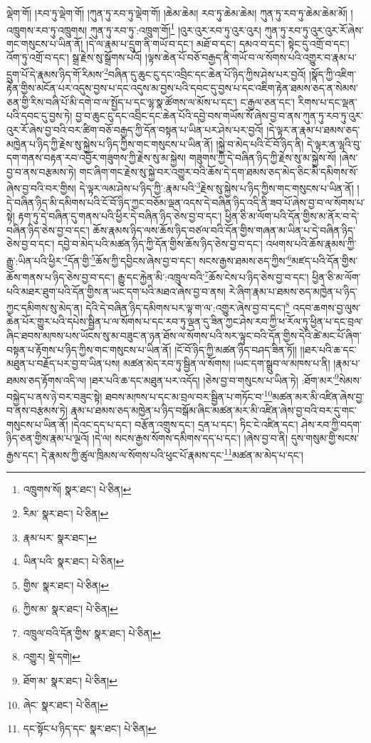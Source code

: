 ལྡེག་གོ། །རབ་ཏུ་ལྡེག་གོ། །ཀུན་ཏུ་རབ་ཏུ་ལྡེག་གོ། །ཆེམ་ཆེམ། རབ་ཏུ་ཆེམ་ཆེམ། ཀུན་ཏུ་རབ་ཏུ་ཆེམ་ཆེམ་མོ། །འཁྲུགས་རབ་ཏུ་འཁྲུགས། ཀུན་ཏུ་རབ་ཏུ་:འཁྲུག་གོ།\footnote{འཁྲུགས་སོ།  སྣར་ཐང་།  པེ་ཅིན། } །འུར་འུར་རབ་ཏུ་འུར་འུར། ཀུན་ཏུ་རབ་ཏུ་འུར་འུར་རོ་ཞེས་གང་གསུངས་པ་ཡིན་ནོ། །དེ་ལ་རྣམ་པ་དྲུག་ནི་གཡོ་བ་དང་། མཐོ་བ་དང་། དམའ་བ་དང་། སྟེང་དུ་འགྲོ་བ་དང་། འོག་ཏུ་འགྲོ་བ་དང་། སྒྲ་རྗེས་སུ་སྒྲོགས་པའོ། །ལྟས་ཆེན་པོ་བཅོ་བརྒྱད་ནི་གཡོ་བ་ལ་སོགས་པའི་འགྱུར་བ་རྣམ་པ་དྲུག་པོ་དེ་རྣམས་ཉིད་གོ་རིམས་\footnote{རིམ་  སྣར་ཐང་།  པེ་ཅིན། }བཞིན་དུ་ཆུང་ངུ་དང་འབྲིང་དང་ཆེན་པོ་ཉིད་ཀྱིས་ཤེས་པར་བྱའོ། །སྣོད་ཀྱི་འཇིག་རྟེན་གྱིས་མངོན་པར་འདུས་བྱས་པ་དང་འདུས་མ་བྱས་པའི་དབང་དུ་བྱས་པ་དང་འཇིག་རྟེན་ཐམས་ཅད་ན་སེམས་ཅན་གྱི་རིས་བཞི་པོ་མི་དགེ་བ་ལ་སྤྱོད་པ་དང་ལྷ་སྣ་ཚོགས་ལ་མོས་པ་དང་། ང་རྒྱལ་ཅན་དང་། རིགས་པ་དང་ལྡན་པའི་དབང་དུ་བྱས་ཏེ། བྱ་བ་ཆུང་ངུ་དང་འབྲིང་དང་ཆེན་པོའི་དབྱེ་བས་གཡོས་སོ་ཞེས་བྱ་བ་ནས་ཀུན་ཏུ་རབ་ཏུ་འུར་འུར་རོ་ཞེས་བྱ་བའི་བར་ཚིག་བཅོ་བརྒྱད་ཀྱི་དོན་བསྟན་པ་ཡིན་པར་ཤེས་པར་བྱའོ། །དེ་ལྟར་ན་རྣམ་པ་ཐམས་ཅད་མཁྱེན་པ་ཉིད་ཀྱི་རྗེས་སུ་སྐྱེས་པ་ཉིད་ཀྱིས་གང་གསུངས་པ་ཡིན་ནོ། །སྐྱེ་བ་མེད་པའི་ངོ་བོ་ཉིད་ནི། དེ་ལྟར་ན་ལྷའི་བུ་དག་གནས་བརྟན་རབ་འབྱོར་གཟུགས་ཀྱི་རྗེས་སུ་མ་སྐྱེས། གཟུགས་ཀྱི་དེ་བཞིན་ཉིད་ཀྱི་རྗེས་སུ་མ་སྐྱེས་སོ། །ཞེས་བྱ་བ་ནས་བརྩམས་ཏེ། གང་ཞིག་གང་རྗེས་སུ་སྐྱེ་བར་འགྱུར་བའི་ཆོས་དེ་དག་ཐམས་ཅད་མེད་ཅིང་མི་དམིགས་སོ་ཞེས་བྱ་བའི་བར་གྱིས། དེ་ལྟར་ལམ་ཤེས་པ་ཉིད་ཀྱི་:རྣམ་པའི་\footnote{རྣམ་པར་  སྣར་ཐང་། }རྗེས་སུ་སྐྱེས་པ་ཉིད་ཀྱིས་གང་གསུངས་པ་ཡིན་ནོ། །དེ་བཞིན་ཉིད་མི་དམིགས་པའི་ངོ་བོ་ཉིད་ཀྱང་བཅོམ་ལྡན་འདས་དེ་བཞིན་ཉིད་འདི་ནི་ཟབ་པོ་ཞེས་བྱ་བ་ལ་སོགས་པ་སྟེ། རྟག་ཏུ་དེ་བཞིན་དུ་གནས་པའི་ཕྱིར་དེ་བཞིན་ཉིད་ཅེས་བྱ་བ་དང་། ཕྱིན་ཅི་མ་ལོག་པའི་དོན་གྱིས་མ་ནོར་བ་དེ་བཞིན་ཉིད་ཅེས་བྱ་བ་དང་། ཆོས་རྣམས་ཉིད་ལས་ཆོས་ཉིད་བཙལ་བའི་དོན་གྱིས་གཞན་མ་ཡིན་པ་དེ་བཞིན་ཉིད་ཅེས་བྱ་བ་དང་། དབྱེ་བ་མེད་པའི་མཚན་ཉིད་ཀྱི་དོན་གྱིས་ཆོས་ཉིད་ཅེས་བྱ་བ་དང་། འཕགས་པའི་ཆོས་རྣམས་ཀྱི་རྒྱུ་:ཡིན་པའི་ཕྱིར་\footnote{ཡིན་པའི་  སྣར་ཐང་།  པེ་ཅིན། }དོན་གྱི་\footnote{གྱིས་  སྣར་ཐང་།  པེ་ཅིན། }ཆོས་ཀྱི་དབྱིངས་ཞེས་བྱ་བ་དང་། སངས་རྒྱས་ཐམས་ཅད་ཀྱིས་\footnote{ཀྱིས་མ་  སྣར་ཐང་།  པེ་ཅིན། }མཛད་པའི་དོན་གྱིས་ཆོས་གནས་པ་ཉིད་ཅེས་བྱ་བ་དང་། རྒྱུ་དང་རྐྱེན་མི་:འཁྲུལ་བའི་\footnote{འཁྲུལ་བའི་དོན་གྱིས་  སྣར་ཐང་།  པེ་ཅིན། }ཆོས་ངེས་པ་ཉིད་ཅེས་བྱ་བ་དང་། ཕྱིན་ཅི་མ་ལོག་པའི་མཐར་ཐུག་པའི་དོན་གྱིས་ན་ཡང་དག་པའི་མཐའ་ཞེས་བྱ་བ་ནས། རེ་ཞིག་རྣམ་པ་ཐམས་ཅད་མཁྱེན་པ་ཉིད་ཀྱང་དམིགས་སུ་མེད་ན། དེའི་དེ་བཞིན་ཉིད་དམིགས་པར་ལྟ་ག་ལ་:འགྱུར་ཞེས་བྱ་བ་དང་།\footnote{འགྱུར།  སྡེ་དགེ། } འདབ་ཆགས་བྱ་ལུས་ཆེན་པོར་གྱུར་པའི་དཔེས་སྦྱིན་པ་ལ་སོགས་པ་དང་རབ་ཏུ་ལྡན་དུ་ཟིན་ཀྱང་ཤེས་རབ་ཀྱི་ཕ་རོལ་ཏུ་ཕྱིན་པ་དང་བྲལ་ཞིང་ཐབས་མཁས་པས་ཡོངས་སུ་མ་བཟུང་ན་ཉན་ཐོས་ལ་སོགས་པའི་སར་ལྟུང་བའི་དོན་གྱིས་དེའི་ཚེ་མང་པོ་ཞིག་བསྟན་པ་རྟོགས་པ་ཉིད་ཀྱིས་གང་གསུངས་པ་ཡིན་ནོ། །ངོ་བོ་ཉིད་ཀྱི་མཚན་ཉིད་བཤད་ཟིན་ཏོ།། །།ཐར་པའི་ཆ་དང་མཐུན་པ་བརྗོད་པར་བྱ་བ་ཡིན་པས། མཚན་མེད་རབ་ཏུ་སྦྱིན་ལ་སོགས། །ཡང་དག་སྒྲུབ་ལ་མཁས་པ་ནི། །རྣམ་པ་ཐམས་ཅད་རྟོགས་འདི་ལ། །ཐར་པའི་ཆ་དང་མཐུན་པར་འདོད། །ཅེས་བྱ་བ་གསུངས་པ་ཡིན་ཏེ། :ཐོག་མར་\footnote{ཐོག་མ་  སྣར་ཐང་།  པེ་ཅིན། }སེམས་བསྐྱེད་པ་ནས་ཉེ་བར་བཟུང་སྟེ། ཐབས་མཁས་པ་དང་མ་བྲལ་བར་སྦྱིན་པ་གཏོང་བ་\footnote{ཞེང་  སྣར་ཐང་།  པེ་ཅིན། }མཚན་མར་མི་འཛིན་ཞེས་བྱ་བ་ནས་བརྩམས་ཏེ། རྣམ་པ་ཐམས་ཅད་མཁྱེན་པ་ཉིད་བསྒོམ་ཞིང་མཚན་མར་མི་འཛིན་ཞེས་བྱ་བའི་བར་དུ་གང་གསུངས་པ་ཡིན་ནོ། །དེའང་དད་པ་དང་། བརྩོན་འགྲུས་དང་། དྲན་པ་དང་། ཏིང་ངེ་འཛིན་དང་། ཤེས་རབ་ཀྱི་བདག་ཉིད་ཅན་གྱིས་རྣམ་པ་ལྔའོ། །དེ་ལ། སངས་རྒྱས་སོགས་དམིགས་དད་པ་དང་། །ཞེས་བྱ་བ་ནི། དུས་གསུམ་གྱི་སངས་རྒྱས་དང་། དེ་རྣམས་ཀྱི་ཚུལ་ཁྲིམས་ལ་སོགས་པའི་ཕུང་པོ་རྣམས་དང་\footnote{དང་སྟོང་པ་ཉིད་དང་  སྣར་ཐང་།  པེ་ཅིན། }མཚན་མ་མེད་པ་དང་། 